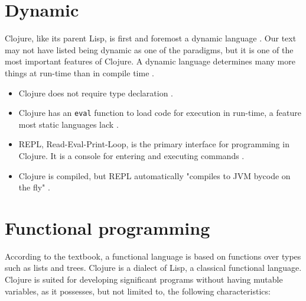 \documentclass[12pt]{article}
\begin{document}
\part{Dynamic}

Clojure, like its parent Lisp, is first and foremost a dynamic language \cite{clojuredyn}. Our text may not have listed being dynamic as one of the paradigms, but it is one of the most important features of Clojure. A dynamic language determines many more things at run-time than in compile time \cite{rathore2011clojure}. 

\begin{itemize}
\item Clojure does not require type declaration \cite{rathore2011clojure}.
\item Clojure has an \texttt{eval} function to load code for execution in run-time, a feature most static languages lack \cite{rathore2011clojure}. 
\item REPL, Read-Eval-Print-Loop, is the primary interface for programming in Clojure. It is a console for entering and executing commands \cite{clojuredyn}.
\item Clojure is compiled, but REPL automatically "compiles to JVM bycode on the fly" \cite{clojuredyn}. 
\end{itemize}

\part{Functional programming}

According to the textbook, a functional language is based on functions over types such as lists and trees. Clojure is a dialect of Lisp,  a classical functional language. Clojure is suited for developing significant programs without having mutable variables, as it possesses, but not limited to, the following characteristics:
\end{document}

